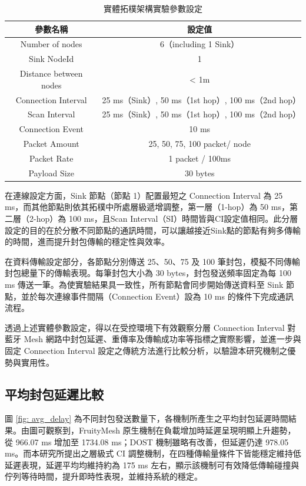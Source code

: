 \begin{ZhChapter}
\begin{table}[H]
    \centering
    \caption{實體拓樸架構實驗參數設定}
    \label{tab: 實體拓樸架構實驗參數設定}
    \begin{tabular}{|c|c|}
        \hline
        參數名稱 & 設定值 \\
        \hline
        Number of nodes & 6（including 1 Sink） \\
        \hline
        Sink NodeId & 1 \\
        \hline
        Distance between nodes & < 1m \\
        \hline
        Connection Interval & 25 ms（Sink）, 50 ms（1st hop）, 100 ms（2nd hop） \\
        \hline
        Scan Interval & 25 ms（Sink）, 50 ms（1st hop）, 100 ms（2nd hop）\\
        \hline
        Connection Event & 10 ms \\
        \hline
        Packet Amount & 25, 50, 75, 100 packet/ node \\
        \hline
        Packet Rate & 1 packet / 100ms \\
        \hline
        Payload Size & 30 bytes \\
        \hline
    \end{tabular}
\end{table}

在連線設定方面，Sink 節點（節點 1）配置最短之 Connection Interval 為 25 ms，而其他節點則依其拓樸中所處層級遞增調整，第一層（1-hop）為 50 ms，第二層（2-hop）為 100 ms，且Scan Interval（SI）時間皆與CI設定值相同。此分層設定的目的在於分散不同節點的通訊時間，可以讓越接近Sink點的節點有夠多傳輸的時間，進而提升封包傳輸的穩定性與效率。

在資料傳輸設定部分，各節點分別傳送 25、50、75 及 100 筆封包，模擬不同傳輸封包總量下的傳輸表現。每筆封包大小為 30 bytes，封包發送頻率固定為每 100 ms 傳送一筆。為使實驗結果具一致性，所有節點會同步開始傳送資料至 Sink 節點，並於每次連線事件間隔（Connection Event）設為 10 ms 的條件下完成通訊流程。

透過上述實體參數設定，得以在受控環境下有效觀察分層 Connection Interval 對藍牙 Mesh 網路中封包延遲、重傳率及傳輸成功率等指標之實際影響，並進一步與固定 Connection Interval 設定之傳統方法進行比較分析，以驗證本研究機制之優勢與實用性。

\subsection{平均封包延遲比較}
圖 \ref{fig: avg_delay} 為不同封包發送數量下，各機制所產生之平均封包延遲時間結果。由圖可觀察到，FruityMesh 原生機制在負載增加時延遲呈現明顯上升趨勢，從 966.07 ms 增加至 1734.08 ms；DOST 機制雖略有改善，但延遲仍達 978.05 ms。而本研究所提出之層級式 CI 調整機制，在四種傳輸量條件下皆能穩定維持低延遲表現，延遲平均均維持約為 175 ms 左右，顯示該機制可有效降低傳輸碰撞與佇列等待時間，提升即時性表現，並維持系統的穩定。


\end{ZhChapter}
